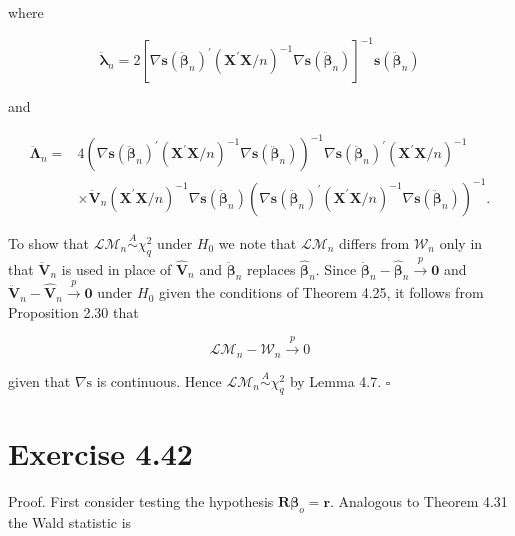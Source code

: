 \documentclass[10pt]{article}
\begin{document}
where

$$
\ddot{\boldsymbol{\lambda}}_{n}=2\left[\nabla \mathbf{s}\left(\ddot{\boldsymbol{\beta}}_{n}\right)^{\prime}\left(\mathbf{X}^{\prime} \mathbf{X} / n\right)^{-1} \nabla \mathbf{s}\left(\ddot{\boldsymbol{\beta}}_{n}\right)\right]^{-1} \mathbf{s}\left(\ddot{\boldsymbol{\beta}}_{n}\right)
$$

and

$$
\begin{aligned}
\ddot{\boldsymbol{\Lambda}}_{n}= & 4\left(\nabla \mathbf{s}\left(\ddot{\boldsymbol{\beta}}_{n}\right)^{\prime}\left(\mathbf{X}^{\prime} \mathbf{X} / n\right)^{-1} \nabla \mathbf{s}\left(\ddot{\boldsymbol{\beta}}_{n}\right)\right)^{-1} \nabla \mathbf{s}\left(\ddot{\boldsymbol{\beta}}_{n}\right)^{\prime}\left(\mathbf{X}^{\prime} \mathbf{X} / n\right)^{-1} \\
& \times \ddot{\mathbf{V}}_{n}\left(\mathbf{X}^{\prime} \mathbf{X} / n\right)^{-1} \nabla \mathbf{s}\left(\ddot{\boldsymbol{\beta}}_{n}\right)\left(\nabla \mathbf{s}\left(\ddot{\boldsymbol{\beta}}_{n}\right)^{\prime}\left(\mathbf{X}^{\prime} \mathbf{X} / n\right)^{-1} \nabla \mathbf{s}\left(\ddot{\boldsymbol{\beta}}_{n}\right)\right)^{-1} .
\end{aligned}
$$

To show that $\mathcal{L} \mathcal{M}_{n} \stackrel{A}{\sim} \chi_{q}^{2}$ under $H_{0}$ we note that $\mathcal{L} \mathcal{M}_{n}$ differs from $\mathcal{W}_{n}$ only in that $\ddot{\mathbf{V}}_{n}$ is used in place of $\hat{\mathbf{V}}_{n}$ and $\ddot{\boldsymbol{\beta}}_{n}$ replaces $\hat{\boldsymbol{\beta}}_{n}$. Since $\ddot{\boldsymbol{\beta}}_{n}-\hat{\boldsymbol{\beta}}_{n} \xrightarrow{p} \mathbf{0}$ and $\ddot{\mathbf{V}}_{n}-\hat{\mathbf{V}}_{n} \xrightarrow{p} \mathbf{0}$ under $H_{0}$ given the conditions of Theorem 4.25, it follows from Proposition 2.30 that

$$
\mathcal{L} \mathcal{M}_{n}-\mathcal{W}_{n} \xrightarrow{p} 0
$$

given that $\nabla \mathrm{s}$ is continuous. Hence $\mathcal{L} \mathcal{M}_{n} \stackrel{A}{\sim} \chi_{q}^{2}$ by Lemma 4.7. \(\square\)

\section*{Exercise 4.42}
Proof. First consider testing the hypothesis $\mathbf{R} \boldsymbol{\beta}_{o}=\mathbf{r}$. Analogous to Theorem 4.31 the Wald statistic is
\end{document}
